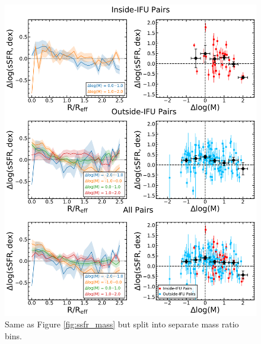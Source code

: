 \documentclass[iop,revtex4,twocolumn,apj,numberedappendix,appendixfloats]{emulateapj}
\begin{document}
\begin{figure}
\centering
\includegraphics[width=\linewidth]{fig/ssfr_dm.pdf}
\caption[The $\Delta$log(sSFR) split by mass ratio.]{Same as Figure \ref{fig:ssfr_mass} but split into separate mass ratio bins.}
\label{fig:ssfr_dm}
\end{figure}
\end{document}
